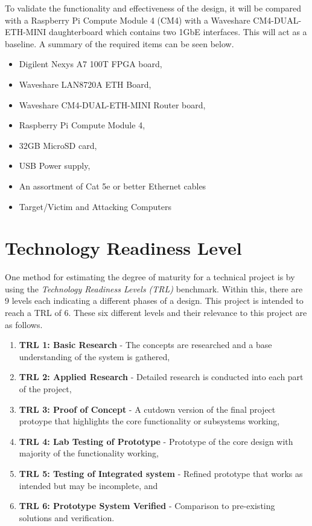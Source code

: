 To validate the functionality and effectiveness of the design, it will be compared with a Raspberry Pi Compute Module 4 (CM4) with a Waveshare CM4-DUAL-ETH-MINI 
daughterboard which contains two 1GbE interfaces. This will act as a baseline. A summary of the required items can be seen below.

\begin{itemize}
    \item Digilent Nexys A7 100T FPGA board,
    \item Waveshare LAN8720A ETH Board,
    \item Waveshare CM4-DUAL-ETH-MINI Router board,
    \item Raspberry Pi Compute Module 4,
    \item 32GB MicroSD card,
    \item USB Power supply,
    \item An assortment of Cat 5e or better Ethernet cables
    \item Target/Victim and Attacking Computers
\end{itemize}


\section{Technology Readiness Level}

One method for estimating the degree of maturity for a technical project is by using the \textit{Technology Readiness Levels (TRL)} benchmark. Within this, 
there are 9 levels each indicating a different phases of a design. This project is intended to reach a TRL of 6. These six different levels and their 
relevance to this project are as follows. 

\begin{enumerate}
    \item \textbf{TRL 1: Basic Research} - The concepts are researched and a base understanding of the system is gathered,
    \item \textbf{TRL 2: Applied Research} - Detailed research is conducted into each part of the project,
    \item \textbf{TRL 3: Proof of Concept} - A cutdown version of the final project protoype that highlights the core functionality or subsystems working,
    \item \textbf{TRL 4: Lab Testing of Prototype} - Prototype of the core design with majority of the functionality working,
    \item \textbf{TRL 5: Testing of Integrated system} - Refined prototype that works as intended but may be incomplete, and
    \item \textbf{TRL 6: Prototype System Verified} - Comparison to pre-existing solutions and verification. 
\end{enumerate}


